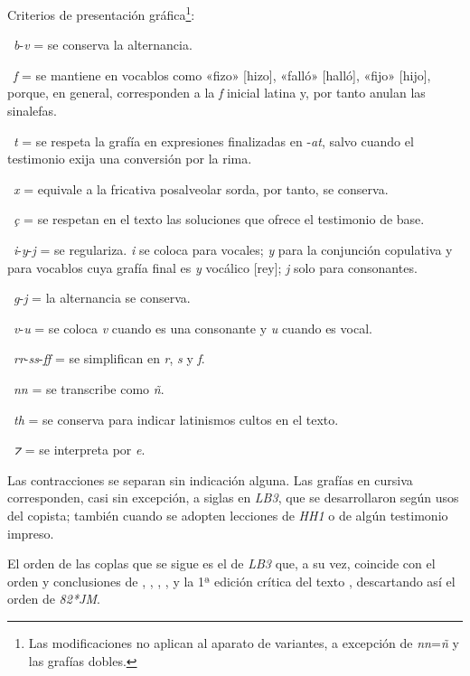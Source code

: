 \documentclass[11pt,a4paper,twoside]{article}
\newcommand{\comillas}[1]{«#1»}
\begin{document}
Criterios de presentación gráfica\footnote{Las modificaciones no aplican al aparato de variantes, a excepción de \textit{nn}=\textit{ñ} y las grafías dobles.}:

~\textit{b}-\textit{v} = se conserva la alternancia.

~\textit{f} = se mantiene en vocablos como \comillas{fizo} [hizo], \comillas{falló} [halló], \comillas{fijo} [hijo], porque, en general, corresponden a la \textit{f} inicial latina y, por tanto anulan las sinalefas.

~\textit{t} = se respeta la grafía en expresiones finalizadas en -\textit{at}, salvo cuando el testimonio exija una conversión por la rima.

~\textit{x} = equivale a la fricativa posalveolar sorda, por tanto, se conserva.

~\textit{ç} = se respetan en el texto las soluciones que ofrece el testimonio de base.

~\textit{i}-\textit{y}-\textit{j} = se regulariza. \textit{i} se coloca para vocales; \textit{y} para la conjunción copulativa y para vocablos cuya grafía final es \textit{y} vocálico [rey]; \textit{j} solo para consonantes.

~\textit{g}-\textit{j} = la alternancia se conserva.

~\textit{v}-\textit{u} = se coloca \textit{v} cuando es una consonante y \textit{u} cuando es vocal.

~\textit{rr}-\textit{ss}-\textit{ff} = se simplifican en \textit{r}, \textit{s} y \textit{f}.

~\textit{nn} = se transcribe como \textit{ñ}.

~\textit{th} = se conserva para indicar latinismos cultos en el texto.

~\textit{⁊} = se interpreta por \textit{e}.

Las contracciones se separan sin indicación alguna. Las grafías en cursiva corresponden, casi sin excepción, a siglas en \textit{LB3}, que se desarrollaron según usos del copista; también cuando se adopten lecciones de \textit{HH1} o de algún testimonio impreso.

El orden de las coplas que se sigue es el de \textit{LB3} que, a su vez, coincide con el orden y conclusiones de \textcite{Senabre1983}, \textcite{Palumbo1983}, \textcite{Orduna1967}, \textcite{Beltrán1991,Beltrán2013}, \textcite{PérezPriego1990,PérezPriego2017} y la 1ª edición crítica del texto \parencite{Foulché-Delbosc1902}, descartando así el orden de \textit{82*JM}.
\end{document}
